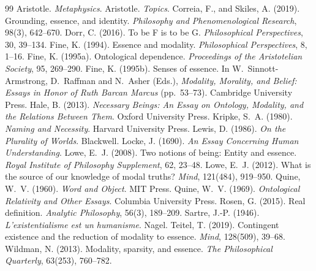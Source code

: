 \documentclass{situationist-preprint}
\begin{document}
\begin{thebibliography}{99}\small
{} Aristotle. \emph{Metaphysics}.
 Aristotle. \emph{Topics}.
 Correia, F., and Skiles, A. (2019). Grounding, essence, and identity. \emph{Philosophy and Phenomenological Research}, 98(3), 642--670.
 Dorr, C. (2016). To be F is to be G. \emph{Philosophical Perspectives}, 30, 39--134.
 Fine, K. (1994). Essence and modality. \emph{Philosophical Perspectives}, 8, 1--16.
 Fine, K. (1995a). Ontological dependence. \emph{Proceedings of the Aristotelian Society}, 95, 269--290.
 Fine, K. (1995b). Senses of essence. In W.~Sinnott-Armstrong, D.~Raffman and N.~Asher (Eds.), \emph{Modality, Morality, and Belief: Essays in Honor of Ruth Barcan Marcus} (pp.~53--73). Cambridge University Press.
 Hale, B. (2013). \emph{Necessary Beings: An Essay on Ontology, Modality, and the Relations Between Them}. Oxford University Press.
 Kripke, S.~A. (1980). \emph{Naming and Necessity}. Harvard University Press.
 Lewis, D. (1986). \emph{On the Plurality of Worlds}. Blackwell.
 Locke, J. (1690). \emph{An Essay Concerning Human Understanding}.
 Lowe, E.~J. (2008). Two notions of being: Entity and essence. \emph{Royal Institute of Philosophy Supplement}, 62, 23--48.
 Lowe, E.~J. (2012). What is the source of our knowledge of modal truths? \emph{Mind}, 121(484), 919--950.
 Quine, W.~V. (1960). \emph{Word and Object}. MIT Press.
 Quine, W.~V. (1969). \emph{Ontological Relativity and Other Essays}. Columbia University Press.
 Rosen, G. (2015). Real definition. \emph{Analytic Philosophy}, 56(3), 189--209.
 Sartre, J.-P. (1946). \emph{L'existentialisme est un humanisme}. Nagel.
 Teitel, T. (2019). Contingent existence and the reduction of modality to essence. \emph{Mind}, 128(509), 39--68.
 Wildman, N. (2013). Modality, sparsity, and essence. \emph{The Philosophical Quarterly}, 63(253), 760--782.
\end{thebibliography}
\end{document}

